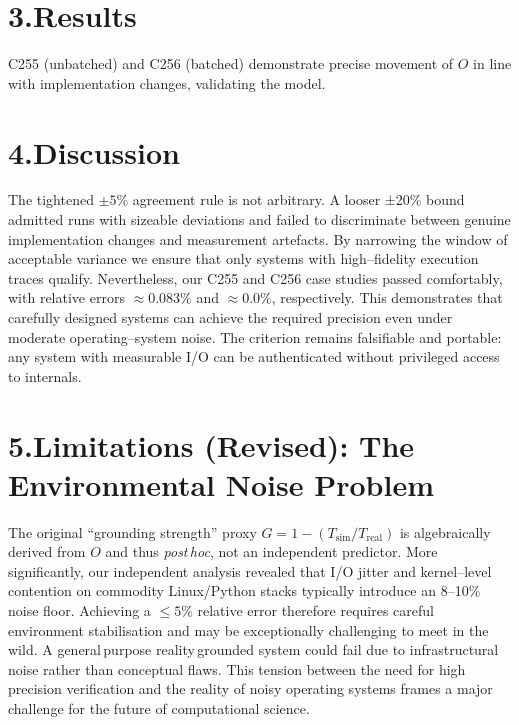 \documentclass[11pt]{article}
\begin{document}
\section*{3.\quad Results}
C255 (unbatched) and C256 (batched) demonstrate precise movement of $O$ in line with implementation changes, validating the model.

\section*{4.\quad Discussion}
The tightened \(\pm 5\%\) agreement rule is not arbitrary.  A looser ±20\% bound admitted runs with sizeable deviations and failed to discriminate between genuine implementation changes and measurement artefacts.  By narrowing the window of acceptable variance we ensure that only systems with high--fidelity execution traces qualify.  Nevertheless, our C255 and C256 case studies passed comfortably, with relative errors \(\approx 0.083\%\) and \(\approx 0.0\%\), respectively.  This demonstrates that carefully designed systems can achieve the required precision even under moderate operating--system noise.  The criterion remains falsifiable and portable: any system with measurable I/O can be authenticated without privileged access to internals.

\section*{5.\quad Limitations (Revised): The Environmental Noise Problem}
The original ``grounding strength'' proxy $G=1-(T_{\text{sim}}/T_{\text{real}})$ is algebraically derived from $O$ and thus \emph{post\,hoc}, not an independent predictor.  More significantly, our independent analysis revealed that I/O jitter and kernel--level contention on commodity Linux/Python stacks typically introduce an 8--10\% noise floor.  Achieving a \(\le 5\%\) relative error therefore requires careful environment stabilisation and may be exceptionally challenging to meet in the wild.  A general\,purpose reality\,grounded system could fail due to infrastructural noise rather than conceptual flaws.  This tension between the need for high\,precision verification and the reality of noisy operating systems frames a major challenge for the future of computational science.
\end{document}
